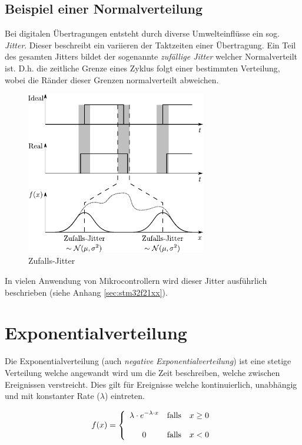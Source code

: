 \clearpage

\subsection{Beispiel einer Normalverteilung}
Bei digitalen Übertragungen entsteht durch diverse Umwelteinflüsse 
ein sog. \emph{Jitter}. Dieser beschreibt ein variieren der 
Taktzeiten einer Übertragung. Ein Teil des gesamten Jitters bildet 
der sogenannte \emph{zufällige Jitter} welcher Normalverteilt ist.
D.h. die zeitliche Grenze eines Zyklus folgt einer bestimmten
Verteilung, wobei die Ränder dieser Grenzen normalverteilt abweichen.

\begin{figure}[h!]
	\centering
	\includegraphics[width=0.7\textwidth]{jitter.pdf}
	\caption{Zufalls-Jitter}
	\label{fig:jitter}
\end{figure}

In vielen Anwendung von Mikrocontrollern  wird dieser Jitter ausführlich
beschrieben (siehe Anhang \ref{sec:stm32f21xx}).

\clearpage

\newpage
\section{Exponentialverteilung}
Die Exponentialverteilung (auch \emph{negative Exponentialverteilung}) ist 
eine stetige Verteilung welche angewandt wird um die Zeit beschreiben, welche
zwischen Ereignissen verstreicht. Dies gilt für Ereignisse  welche 
kontinuierlich, unabhängig und mit konstanter Rate ($\lambda$) eintreten.

\[  
	f(x) = \left\{ 
	\begin{array}{c c l}
		\displaystyle 
		\lambda \cdot e^{-\lambda \cdot x}
			& \text{falls}
			& x \geq 0 \\
		& & \\
		\displaystyle 
		0
			& \text{falls}
			& x < 0
	\end{array}
	\right.
\]

